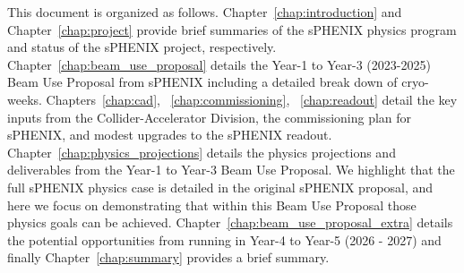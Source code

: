 This document is organized as follows.    Chapter~\ref{chap:introduction} and Chapter~\ref{chap:project} provide brief summaries of the sPHENIX physics program and status of the sPHENIX project, respectively.    Chapter~\ref{chap:beam_use_proposal} details the Year-1 to Year-3 (2023-2025) Beam Use Proposal from sPHENIX including a detailed break down of cryo-weeks.    Chapters~\ref{chap:cad}, ~\ref{chap:commissioning}, ~\ref{chap:readout} detail the key inputs from the Collider-Accelerator Division, the commissioning plan for sPHENIX, and modest upgrades to the sPHENIX readout.    Chapter~\ref{chap:physics_projections} details the physics projections and deliverables from the Year-1 to Year-3 Beam Use Proposal.    We highlight that the full sPHENIX physics case is detailed in the original sPHENIX proposal, and here we focus on demonstrating that within this Beam Use Proposal those physics goals can be achieved.   Chapter~\ref{chap:beam_use_proposal_extra} details the potential opportunities from running in Year-4 to Year-5 (2026 - 2027) and finally Chapter~\ref{chap:summary} provides a brief summary. 

%


